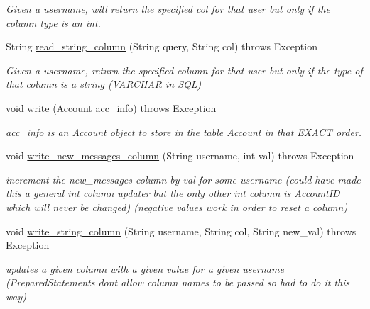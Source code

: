 \begin{DoxyCompactItemize}
\begin{DoxyCompactList}\small\item\em Given a username, will return the specified col for that user but only if the column type is an int. \end{DoxyCompactList}\item 
String \hyperlink{class_read_write_account_a088ef942f68e5e969c153b241b534ff5}{read\+\_\+string\+\_\+column} (String query, String col)  throws Exception     
\begin{DoxyCompactList}\small\item\em Given a username, return the specified column for that user but only if the type of that column is a string (V\+A\+R\+C\+H\+AR in S\+QL) \end{DoxyCompactList}\item 
\mbox{\label{class_read_write_account_a4cba2dcd68941a0685d952324e69b63e}} 
void \hyperlink{class_read_write_account_a4cba2dcd68941a0685d952324e69b63e}{write} (\hyperlink{class_account}{Account} acc\+\_\+info)  throws Exception     
\begin{DoxyCompactList}\small\item\em acc\+\_\+info is an \hyperlink{class_account}{Account} object to store in the table \hyperlink{class_account}{Account} in that E\+X\+A\+CT order. \end{DoxyCompactList}\item 
\mbox{\label{class_read_write_account_a3579e4d897bffab4b4406e18414f3835}} 
void \hyperlink{class_read_write_account_a3579e4d897bffab4b4406e18414f3835}{write\+\_\+new\+\_\+messages\+\_\+column} (String username, int val)  throws Exception     
\begin{DoxyCompactList}\small\item\em increment the new\+\_\+messages column by val for some username (could have made this a general int column updater but the only other int column is Account\+ID which will never be changed) (negative values work in order to reset a column) \end{DoxyCompactList}\item 
\mbox{\label{class_read_write_account_a2a0ede48891400ae63ca99f600c6899c}} 
void \hyperlink{class_read_write_account_a2a0ede48891400ae63ca99f600c6899c}{write\+\_\+string\+\_\+column} (String username, String col, String new\+\_\+val)  throws Exception     
\begin{DoxyCompactList}\small\item\em updates a given column with a given value for a given username (Prepared\+Statements dont allow column names to be passed so had to do it this way) \end{DoxyCompactList}\end{DoxyCompactItemize}

